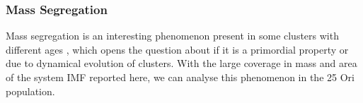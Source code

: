 \documentclass[12pt]{article}
\begin{document}

\subsubsection{Mass Segregation}
\label{sec_IMF:mass_segregation}

Mass segregation is an interesting phenomenon present in some clusters with different ages \citep[e.g. ][]{Lada-Lada2003}, which opens the question about if it is a primordial property \citep{Bonnell-Davies1998,Bonnell2001} or due to dynamical evolution \citep{Kroupa2001a,Kroupa2001b} of clusters. With the large coverage in mass and area of the system IMF reported here, we can analyse this phenomenon in the 25 Ori population.%

\end{document}
